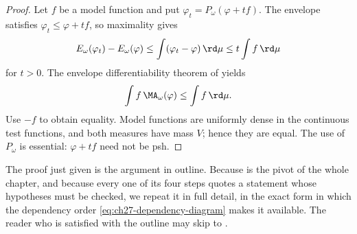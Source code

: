 \begin{proof}
Let \(f\) be a model function and put
\(\varphi_t=P_\omega(\varphi+tf)\).  The envelope satisfies
\(\varphi_t\leq\varphi+tf\), so maximality gives
\[
 E_\omega(\varphi_t)-E_\omega(\varphi)
 \leq\int(\varphi_t-\varphi)\,\rd \mu
 \leq t\int f\,\rd \mu
\]
for \(t>0\).  The envelope differentiability theorem of
 yields
\[
                    \int f\,\MA_\omega(\varphi)
                    \leq\int f\,\rd \mu.
\]
Use \(-f\) to obtain equality.  Model functions are uniformly dense in the
continuous test functions, and both measures have mass \(V\); hence they
are equal.  The use of \(P_\omega\) is essential: \(\varphi+tf\) need not
be psh.
\end{proof}

The proof just given is the argument in outline.  Because
 is the pivot of the whole chapter,
and because every one of its four steps quotes a statement whose hypotheses
must be checked, we repeat it in full detail, in the exact form in which the
dependency order \eqref{eq:ch27-dependency-diagram} makes it available.  The
reader who is satisfied with the outline may skip to
.

